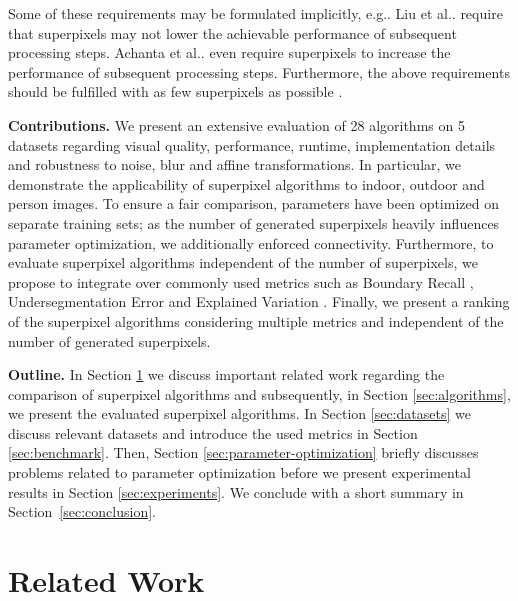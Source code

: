 \documentclass[5p]{elsarticle}
\makeatletter
\DeclareRobustCommand\onedot{\futurelet\@let@token\@onedot}
\def\@onedot{\ifx\@let@token.\else.\null\fi\xspace}
\def\eg{{e.g}\onedot} \def\Eg{{E.g}\onedot}
\def\etal{{et al}\onedot}
\def\NAlgorithms{28\xspace}
\makeatother
\begin{document}
Some of these requirements may be formulated implicitly, \eg Liu \etal \cite{LiuTuzelRamalingamChellappa:2011}
require that superpixels may not lower the achievable performance of subsequent processing steps.
Achanta \etal \cite{AchantaShajiSmithLucchiFuaSuesstrunk:2012} even require superpixels to
increase the performance of subsequent processing steps. Furthermore, the above requirements
should be fulfilled with as few superpixels as possible \cite{LiuTuzelRamalingamChellappa:2011}.

\textbf{Contributions.} We present an extensive evaluation of \NAlgorithms algorithms on
5 datasets regarding visual quality, performance, runtime, implementation details and
robustness to noise, blur and affine transformations.
In particular, we demonstrate the applicability of superpixel algorithms to indoor,
outdoor and person images. To ensure a fair comparison, parameters have been optimized
on separate training sets; as the number of generated superpixels heavily influences
parameter optimization, we additionally enforced connectivity. Furthermore, to evaluate
superpixel algorithms independent of the number of superpixels, we propose to integrate
over commonly used metrics such as Boundary Recall \cite{MartinFowlkesMalik:2004},
Undersegmentation Error \cite{LevinshteinStereKutulakosFleetDickinsonSiddiqi:2009, AchantaShajiSmithLucchiFuaSuesstrunk:2012, NeubertProtzel:2012}
and Explained Variation \cite{MoorePrinceWarrellMohammedJones:2008}. Finally,
we present a ranking of the superpixel algorithms considering multiple metrics and
independent of the number of generated superpixels.

\textbf{Outline.} In Section \ref{sec:related-work} we discuss important related
work regarding the comparison of superpixel algorithms and subsequently, in Section \ref{sec:algorithms},
we present the evaluated superpixel algorithms. In Section \ref{sec:datasets} we discuss
relevant datasets and introduce the used metrics in Section \ref{sec:benchmark}.
Then, Section \ref{sec:parameter-optimization} briefly discusses problems related
to parameter optimization before we present experimental results in Section \ref{sec:experiments}.
We conclude with a short summary in Section~\ref{sec:conclusion}.

\section{Related Work}
\label{sec:related-work}
\end{document}
